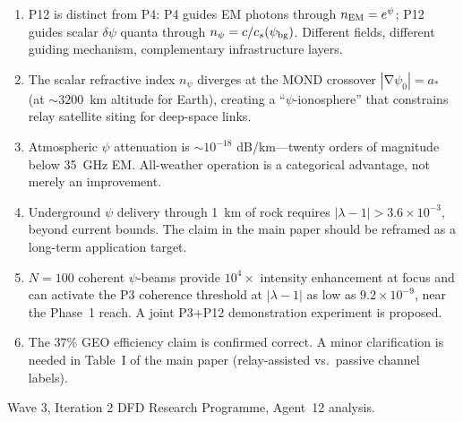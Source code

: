 \documentclass[aps,prd,twocolumn,superscriptaddress]{revtex4-2}
\newcommand{\npsi}{n_\psi}
\DeclareMathOperator{\grad}{\nabla}
\begin{document}
\begin{enumerate}
\item P12 is distinct from P4: P4 guides EM photons through
$n_{\rm EM} = e^\psi$; P12 guides scalar $\delta\psi$ quanta through
$\npsi = c/c_s(\psi_{\rm bg})$.  Different fields, different guiding
mechanism, complementary infrastructure layers.

\item The scalar refractive index $\npsi$ diverges at the MOND crossover
$|\grad\psi_0| = a_*$ (at $\sim 3200$~km altitude for Earth), creating
a ``$\psi$-ionosphere'' that constrains relay satellite siting for
deep-space links.

\item Atmospheric $\psi$ attenuation is $\sim 10^{-18}$ dB/km---twenty
orders of magnitude below 35~GHz EM.  All-weather operation is a
categorical advantage, not merely an improvement.

\item Underground $\psi$ delivery through 1~km of rock requires
$|\lambda-1| > 3.6\times10^{-3}$, beyond current bounds.  The claim
in the main paper should be reframed as a long-term application target.

\item $N = 100$ coherent $\psi$-beams provide $10^4\times$ intensity
enhancement at focus and can activate the P3 coherence threshold at
$|\lambda-1|$ as low as $9.2\times10^{-9}$, near the Phase~1 reach.
A joint P3+P12 demonstration experiment is proposed.

\item The 37\% GEO efficiency claim is confirmed correct.  A minor
clarification is needed in Table~I of the main paper (relay-assisted
vs.\ passive channel labels).
\end{enumerate}

\begin{acknowledgments}
Wave 3, Iteration 2 DFD Research Programme, Agent~12 analysis.
\end{acknowledgments}
\end{document}
